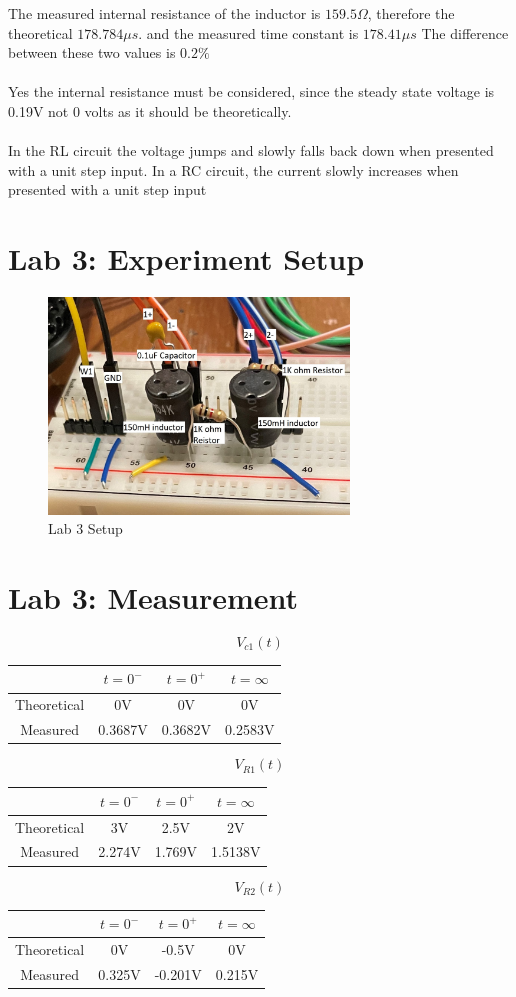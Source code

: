 \documentclass[12pt]{article}
\begin{document}
The measured internal resistance of the inductor is $159.5\Omega$, therefore the theoretical $178.784\mu s$. and the measured time constant is $178.41\mu s$ The difference between these two values is $0.2\%$
\\\\
Yes the internal resistance must be considered, since the steady state voltage is 0.19V not 0 volts as it should be theoretically.
\\\\
In the RL circuit the voltage jumps and slowly falls back down when presented with a unit step input. In a RC circuit, the current slowly increases when presented with a unit step input
\pagebreak
\section*{Lab 3: Experiment Setup}
\begin{figure}[h]
\includegraphics[width=8cm]{Lab3}
\centering
\caption{Lab 3 Setup}
\end{figure}
\section*{Lab 3: Measurement}
\begin{center}
$$V_{c1}(t)$$
\begin{tabular}{|c|c|c|c|}
\hline
& $t=0^-$ & $t=0^+$ & $t=\infty$\\
\hline
Theoretical & 0V& 0V& 0V\\
\hline
Measured & 0.3687V & 0.3682V & 0.2583V\\
\hline
\end{tabular}

$$V_{R1}(t)$$
\begin{tabular}{|c|c|c|c|}
\hline
& $t=0^-$ & $t=0^+$ & $t=\infty$\\
\hline
Theoretical & 3V& 2.5V & 2V\\
\hline
Measured &2.274V  &1.769V  & 1.5138V  \\
\hline
\end{tabular}

$$V_{R2}(t)$$
\begin{tabular}{|c|c|c|c|}
\hline
& $t=0^-$ & $t=0^+$ & $t=\infty$\\
\hline
Theoretical & 0V& -0.5V & 0V\\
\hline
Measured &0.325V  &-0.201V  & 0.215V  \\
\hline
\end{tabular}
\end{center}
\end{document}
